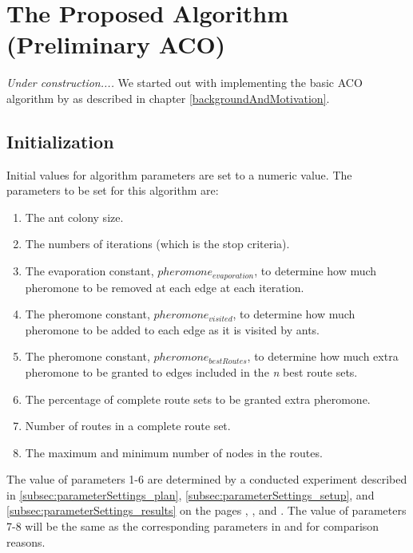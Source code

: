 \section{The Proposed Algorithm (Preliminary ACO) }

\textit{Under construction....}
\newline
We started out with implementing the basic ACO algorithm by \citet{nanda11} as described in chapter \ref{backgroundAndMotivation}.

\subsection{Initialization}
Initial values for algorithm parameters are set to a numeric value. The parameters to be set for this algorithm are:
\begin{enumerate}
\item The ant colony size. 
\item The numbers of iterations (which is the stop criteria).
\item The evaporation constant, $pheromone_{evaporation}$, to determine how much pheromone to be removed at each edge at each iteration.
\item The pheromone constant, $pheromone_{visited}$, to determine how much pheromone to be added to each edge as it is visited by ants.
\item The pheromone constant, $pheromone_{bestRoutes}$, to determine how much extra pheromone to be granted to edges included in the \textit{n} best route sets.
\item The percentage of complete route sets to be granted extra pheromone.
\item Number of routes in a complete route set. 
\item The maximum and minimum number of nodes in the routes.
\end{enumerate}
The value of parameters 1-6 are determined by a conducted experiment described in \ref{subsec:parameterSettings_plan}, \ref{subsec:parameterSettings_setup}, and \ref{subsec:parameterSettings_results} on the pages \pageref{subsec:parameterSettings_plan}, \pageref{subsec:parameterSettings_setup}, and \pageref{subsec:parameterSettings_results}. The value of parameters 7-8 will be the same as the corresponding parameters in \citet{kechagiopoulos14} and \citet{nikolic14} for comparison reasons. 

